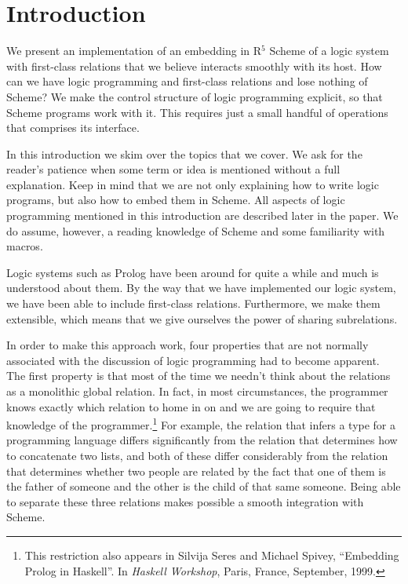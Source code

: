 \section{Introduction}
We present an implementation of an embedding in R$^5$
Scheme of a logic system with first-class relations
that we believe interacts smoothly with its host.  How can we have
logic programming and first-class relations and lose nothing of
Scheme?  We make the control structure of logic programming explicit,
so that Scheme programs work with it.  This requires just a small
handful of operations that comprises its interface.

In this introduction we skim over the topics that we cover.  We ask for the
reader's patience when some term or idea is mentioned without a full
explanation.  Keep in mind that we are not only explaining how to write logic
programs, but also how to embed them in Scheme.  All aspects of logic
programming mentioned in this introduction are described later in the paper.
We do assume, however, a reading knowledge of Scheme and some familiarity with
macros.

Logic systems such as Prolog have been around for quite a while and much is
understood about them.  By the way that we have implemented our logic system,
we have been able to include first-class relations.  Furthermore, we make them
extensible, which means that we give ourselves the power of sharing
subrelations.

In order to make this approach work, four properties that are not normally
associated with the discussion of logic programming had to become apparent.
The first property is that most of the time we needn't think about the
relations as a monolithic global relation.  In fact, in most circumstances, the
programmer knows exactly which relation to home in on and we are going to
require that knowledge of the programmer.\footnote{This restriction also
appears in Silvija Seres and Michael Spivey, ``Embedding Prolog in Haskell''.
In \emph{Haskell Workshop}, Paris, France, September, 1999.}  For example, the
relation that infers a type for a programming language differs significantly
from the relation that determines how to concatenate two lists, and both of
these differ considerably from the relation that determines whether two people
are related by the fact that one of them is the father of someone and the other
is the child of that same someone.  Being able to separate these three
relations makes possible a smooth integration with Scheme.

